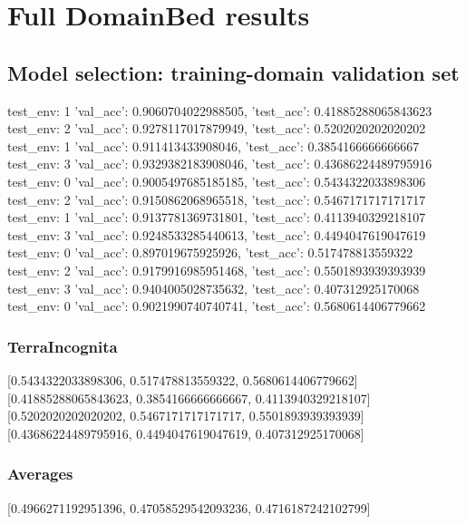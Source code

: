 \documentclass{article}
\begin{document}
\section{Full DomainBed results}

\subsection{Model selection: training-domain validation set}
test_env: 1
{'val_acc': 0.9060704022988505, 'test_acc': 0.41885288065843623}
test_env: 2
{'val_acc': 0.9278117017879949, 'test_acc': 0.5202020202020202}
test_env: 1
{'val_acc': 0.911413433908046, 'test_acc': 0.3854166666666667}
test_env: 3
{'val_acc': 0.9329382183908046, 'test_acc': 0.43686224489795916}
test_env: 0
{'val_acc': 0.9005497685185185, 'test_acc': 0.5434322033898306}
test_env: 2
{'val_acc': 0.9150862068965518, 'test_acc': 0.5467171717171717}
test_env: 1
{'val_acc': 0.9137781369731801, 'test_acc': 0.4113940329218107}
test_env: 3
{'val_acc': 0.9248533285440613, 'test_acc': 0.4494047619047619}
test_env: 0
{'val_acc': 0.897019675925926, 'test_acc': 0.517478813559322}
test_env: 2
{'val_acc': 0.9179916985951468, 'test_acc': 0.5501893939393939}
test_env: 3
{'val_acc': 0.9404005028735632, 'test_acc': 0.407312925170068}
test_env: 0
{'val_acc': 0.9021990740740741, 'test_acc': 0.5680614406779662}

\subsubsection{TerraIncognita}
[0.5434322033898306, 0.517478813559322, 0.5680614406779662]
[0.41885288065843623, 0.3854166666666667, 0.4113940329218107]
[0.5202020202020202, 0.5467171717171717, 0.5501893939393939]
[0.43686224489795916, 0.4494047619047619, 0.407312925170068]

\begin{center}
\end{center}

\subsubsection{Averages}
[0.4966271192951396, 0.47058529542093236, 0.4716187242102799]

\begin{center}
\end{center}
\end{document}
